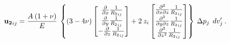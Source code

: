 \documentclass[journal abbreviation, manuscript]{copernicus}
\begin{document}
\begin{equation}
{\bf{u_{2}}}_{ij} = 
\frac{A  \: (1 + \nu)}{E} \: \left\{   (3  - 4 \nu)
\begin{bmatrix} 
  \: \frac{\partial }{\partial x} {\frac{1}{{R_2}_{ij}}}  \\
  \: \frac{\partial }{\partial y} {\frac{1}{{R_2}_{ij}}}  \\
 - \frac{\partial }{\partial z} {\frac{1}{{R_2}_{ij}}}  
\end{bmatrix}
+ 2 \: z_{i}
\begin{bmatrix} 
\frac{\partial^{2}  }{\partial x \partial z} {\frac{1}{{R_2}_{ij}}} \\
\frac{\partial^{2} }{\partial y \partial z} {\frac{1}{{R_2}_{ij}}} \\
\frac{\partial^{2} }{\partial z^{2}} {\frac{1}{{R_2}_{ij}}} 
\end{bmatrix}
\right\}
\: \Delta p_{j} \: \:dv_j^{\prime} \: .
\label{eq:nucleus-u2-vector}
\end{equation}
\end{document}
